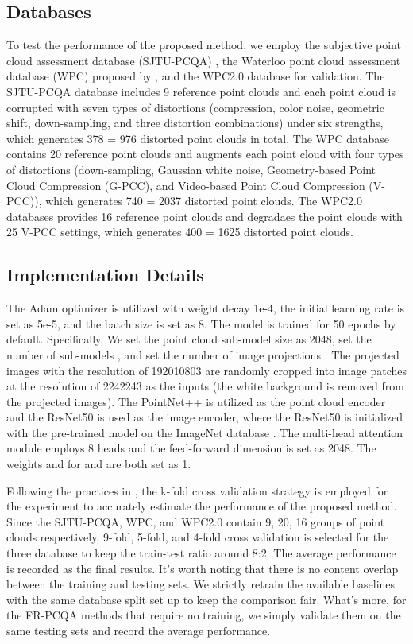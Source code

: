 \documentclass{article}
\begin{document}
\subsection{Databases}
To test the performance of the proposed method, we employ the subjective point cloud assessment database (SJTU-PCQA) \cite{yang2020predicting}, the Waterloo point cloud assessment database (WPC) proposed by \cite{liu2022perceptual}, and the WPC2.0 database \cite{liu2021reduced} for validation. The SJTU-PCQA database includes 9 reference point clouds and each point cloud is corrupted with seven types of distortions (compression, color noise, geometric shift, down-sampling, and three distortion combinations) under six strengths, which generates 378 = 976 distorted point clouds in total.
The WPC database contains 20 reference point clouds and augments each point cloud with four types of distortions (down-sampling, Gaussian white noise, Geometry-based Point Cloud Compression (G-PCC), and Video-based Point Cloud Compression (V-PCC)), which generates 740 = 2037 distorted point clouds. The WPC2.0 databases provides 16 reference point clouds and degradaes the point clouds with 25 V-PCC settings, which generates 400 = 1625 distorted point clouds.

\subsection{Implementation Details}
The Adam optimizer \cite{kingma2014adam} is utilized with weight decay 1e-4, the initial learning rate is set as 5e-5, and the batch size is set as 8. The model is trained for 50 epochs by default. Specifically, We set the point cloud sub-model size  as 2048, set the number of sub-models , and set the number of image projections . The projected images with the resolution of 192010803 are randomly cropped into image patches at the resolution of 2242243 as the inputs (the white background is removed from the projected images). The PointNet++ \cite{qi2017pointnet++} is utilized as the point cloud encoder and the ResNet50 \cite{he2016deep} is used as the image encoder, where the ResNet50 is initialized with the pre-trained model on the ImageNet database \cite{deng2009imagenet}. The multi-head attention module employs 8 heads and the feed-forward dimension is set as 2048. The weights  and  for  and  are both set as 1. 

Following the practices in \cite{fan2022no}, the k-fold cross validation strategy is employed for the experiment to accurately estimate the performance of the proposed method. Since the SJTU-PCQA, WPC, and WPC2.0 contain 9, 20, 16 groups of point clouds respectively, 9-fold, 5-fold, and 4-fold cross validation is selected for the three database to keep the train-test ratio around 8:2. The average performance is recorded as the final results.
It's worth noting that there is no content overlap between the training and testing sets. We strictly retrain the available baselines with the same database split set up to keep the comparison fair. What's more, for the FR-PCQA methods that require no training, we simply validate them on the same testing sets and record the average performance.
\end{document}
